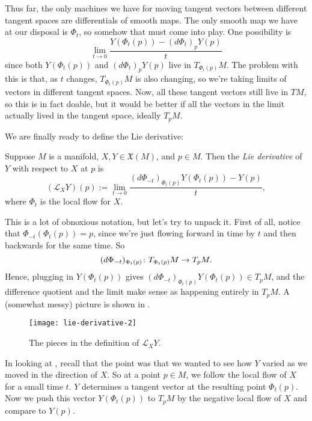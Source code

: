 Thus far, the only machines we have for moving tangent vectors between different tangent spaces are differentials of smooth maps. The only smooth map we have at our disposal is $\Phi_t$, so somehow that must come into play. One possibility is
\[
	\lim_{t \to 0} \frac{Y(\Phi_t(p)) - (d \Phi_t)_p Y(p)}{t}
\]
since both $Y(\Phi_t(p))$ and $(d \Phi_t)_pY(p)$ live in $T_{\Phi_t(p)}M$. The problem with this is that, as $t$ changes, $T_{\Phi_t(p)}M$ is also changing, so we're taking limits of vectors in different tangent spaces. Now, all these tangent vectors still live in $TM$, so this is in fact doable, but it would be better if all the vectors in the limit actually lived in the tangent space, ideally $T_pM$. 

We are finally ready to define the Lie derivative:

\begin{definition}\label{def:Lie derivative}
	Suppose $M$ is a manifold, $X,Y \in \mathfrak{X}(M)$, and $p \in M$. Then the \emph{Lie derivative} of $Y$ with respect to $X$ at $p$ is
	\[
		(\mathcal{L}_XY)(p) := \lim_{t \to 0} \frac{(d \Phi_{-t})_{\Phi_t(p)}Y(\Phi_t(p)) - Y(p)}{t},
	\]
	where $\Phi_t$ is the local flow for $X$.
\end{definition}

This is a lot of obnoxious notation, but let's try to unpack it. First of all, notice that $\Phi_{-t}(\Phi_t(p)) = p$, since we're just flowing forward in time by $t$ and then backwards for the same time. So
\[
	(d\Phi_{-t})_{\Phi_t(p)}\colon\thinspace\! T_{\Phi_t(p)}M \to T_p M.
\]
Hence, plugging in $Y(\Phi_t(p))$ gives $(d\Phi_{-t})_{\Phi_t(p)}Y(\Phi_t(p)) \in T_pM$, and the difference quotient and the limit make sense as happening entirely in $T_pM$. A (somewhat messy) picture is shown in .

\begin{figure}[htbp]
	\centering
		\texttt{[image: lie-derivative-2]}
	\caption{The pieces in the definition of $\mathcal{L}_XY$.}
	\label{fig:lie-derivative2}
\end{figure}

In looking at , recall that the point was that we wanted to see how $Y$ varied as we moved in the direction of $X$. So at a point $p \in M$, we follow the local flow of $X$ for a small time $t$. $Y$ determines a tangent vector at the resulting point $\Phi_t(p)$. Now we push this vector $Y(\Phi_t(p))$ to $T_pM$ by the negative local flow of $X$ and compare to $Y(p)$.

